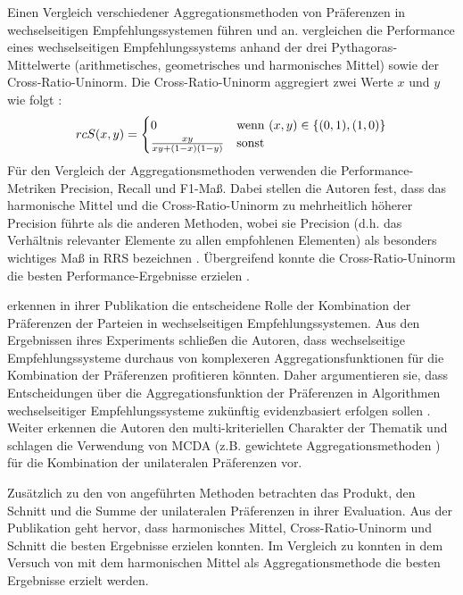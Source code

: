 Einen Vergleich verschiedener Aggregationsmethoden von Präferenzen in wechselseitigen Empfehlungssystemen führen \textcite[S. 4031ff.]{neve:inproceedings} und \textcite[S. 1ff.]{kumari:2:inproceedings} an.
\textcite[S. 4031ff.]{neve:inproceedings} vergleichen die Performance eines wechselseitigen Empfehlungssystems anhand der drei Pythagoras-Mittelwerte (arithmetisches, geometrisches und harmonisches Mittel) sowie der Cross-Ratio-Uninorm.
Die Cross-Ratio-Uni\-norm aggregiert zwei Werte $x$ und $y$ wie folgt \cite[S. 19]{appel:article}:
\begin{equation}\label{eq35}
    rcS(x,y) =
        \begin{cases}
            0 & \textnormal{wenn } (x,y) \in \{(0,1),(1,0)\} \\
            \frac{xy}{xy + (1-x) (1-y)} & \textnormal{sonst } \\
        \end{cases}
\end{equation}
Für den Vergleich der Aggregationsmethoden verwenden \textcite[S. 4034]{neve:inproceedings} die Performance-Metriken Precision, Recall und F1-Maß.
Dabei stellen die Autoren fest, dass das harmonische Mittel und die Cross-Ratio-Uninorm zu mehrheitlich höherer Precision führte als die anderen Methoden, wobei sie Precision (d.h. das Verhältnis relevanter Elemente zu allen empfohlenen Elementen) als besonders wichtiges Maß in \ac{RRS} bezeichnen \cite[S. 4035]{neve:inproceedings}.
Übergreifend konnte die Cross-Ratio-Uninorm die besten Performance-Ergebnisse erzielen \cite[S. 4035]{neve:inproceedings}.

\textcite[S. 4031]{neve:inproceedings} erkennen in ihrer Publikation die entscheidene Rolle der Kombination der Präferenzen der Parteien in wechselseitigen Empfehlungssystemen.
Aus den Ergebnissen ihres Experiments schließen die Autoren, dass wechselseitige Empfehlungssysteme durchaus von komplexeren Aggregationsfunktionen für die Kombination der Präferenzen profitieren könnten.
Daher argumentieren sie, dass Entscheidungen über die Aggregationsfunktion der Präferenzen in Algorithmen wechselseitiger Empfehlungssysteme zukünftig evidenzbasiert erfolgen sollen \cite[S. 4032]{neve:inproceedings}.
Weiter erkennen die Autoren den multi-kriteriellen Charakter der Thematik und schlagen die Verwendung von \ac{MCDA} (z.B. gewichtete Aggregationsmethoden \cite[S. 4036]{neve:inproceedings}) für die Kombination der unilateralen Präferenzen vor.

Zusätzlich zu den von \textcite[S. 4031ff.]{neve:inproceedings} angeführten Methoden betrachten \textcite[S. 1ff.]{kumari:2:inproceedings} das Produkt, den Schnitt und die Summe der unilateralen Präferenzen in ihrer Evaluation.
Aus der Publikation geht hervor, dass harmonisches Mittel, Cross-Ratio-Uninorm und Schnitt die besten Ergebnisse erzielen konnten.
Im Vergleich zu \textcite[S. 4031ff.]{neve:inproceedings} konnten in dem Versuch von \textcite[S. 5]{kumari:2:inproceedings} mit dem harmonischen Mittel als Aggregationsmethode die besten Ergebnisse erzielt werden.

